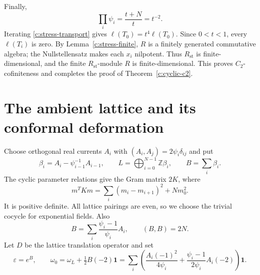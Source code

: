 \documentclass[11pt,a4paper]{article}
\numberwithin{equation}{section}
\theoremstyle{definition}\newtheorem{definition}[theorem]{Definition}
\theoremstyle{remark}\newtheorem{remark}[theorem]{Remark}
\newcommand{\one}{\mathbf1}\newcommand{\B}{\mathcal B}\newcommand{\W}{W_N}
\begin{document}
Finally,
\[
 \prod_i\psi_i=\frac{t+N}{t}=t^{-2}.
\]
Iterating \eqref{c:stress-transport} gives $\ell(T_0)=t^4\ell(T_0)$. Since $0<t<1$, every $\ell(T_i)$ is zero. By Lemma~\ref{c:stress-finite}, $R$ is a finitely generated commutative algebra; the Nullstellensatz makes each $x_i$ nilpotent. Thus $R_{\mathrm{st}}$ is finite-dimensional, and the finite $R_{\mathrm{st}}$-module $R$ is finite-dimensional. This proves $C_2$-cofiniteness and completes the proof of
Theorem~\ref{c:cyclic-c2}.


\section{The ambient lattice and its conformal deformation}\label{c:ambient}
Choose orthogonal real currents $A_i$ with
$(A_i,A_j)=2\psi_i\delta_{ij}$ and put
\[
 \beta_i=A_i-\psi_{i-1}^{-1}A_{i-1},\qquad
 L=\bigoplus_{i=0}^{N-1}\mathbb Z\beta_i,\qquad
 B=\sum_i\beta_i.
\]
The cyclic parameter relations give the Gram matrix $2K$, where
\begin{equation}\label{c:lattice-quadratic}
 m^TKm=\sum_i(m_i-m_{i+1})^2+Nm_0^2.
\end{equation}
It is positive definite.  All lattice pairings are even, so we choose
the trivial cocycle for exponential fields.  Also
\[
 B=\sum_i\frac{\psi_i-1}{\psi_i}A_i,
 \qquad (B,B)=2N.
\]
Let $D$ be the lattice translation operator and set
\[
 \varepsilon=e^B,\qquad
 \omega_0=\omega_L+\tfrac12 B(-2)\one
 =\sum_i\left(\frac{A_i(-1)^2}{4\psi_i}
       +\frac{\psi_i-1}{2\psi_i}A_i(-2)\right)\one.
\]
\end{document}
